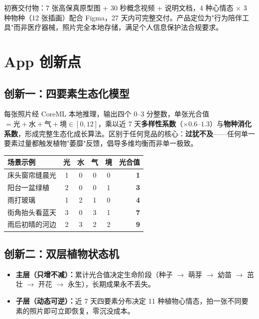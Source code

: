 \documentclass[11pt, a4paper]{article}
\newcommand{\kw}[1]{\textbf{#1}}
\begin{document}
初赛交付物：7 张高保真原型图 + 30 秒概念视频 + 说明文档，4 种心情态 $\times$ 3 种物种（12 张插画）配合 Figma，27 天内可完整交付。产品定位为"行为陪伴工具"而非医疗器械，照片完全本地存储，满足个人信息保护法合规要求。


\section{App 创新点}

\subsection*{创新一：四要素生态化模型}

每张照片经 CoreML 本地推理，输出四个 0--3 分整数，单张光合值 $= \text{光} + \text{水} + \text{气} + \text{境} \in [0,12]$，乘以近 7 天\kw{多样性系数}（$\times 0.6$--$1.3$）与\kw{物种消化系数}，形成完整生态化成长算法。区别于任何竞品的核心：\textbf{过犹不及}——任何单一要素过量都触发植物"萎靡"反馈，倡导多维均衡而非单一极致。

\begin{center}
\begin{tabular}{lccccr}
    \toprule
    \rowcolor{Row}
    场景示例 & 光 & 水 & 气 & 境 & 光合值 \\
    \midrule
    床头窗帘缝晨光 & 1 & 0 & 0 & 0 & \textbf{1} \\
    \rowcolor{Row}
    阳台一盆绿植   & 2 & 0 & 0 & 1 & \textbf{3} \\
    雨打玻璃       & 1 & 2 & 1 & 0 & \textbf{4} \\
    \rowcolor{Row}
    街角抬头看蓝天 & 3 & 0 & 3 & 1 & \textbf{7} \\
    雨后初晴的河边 & 2 & 3 & 2 & 2 & \textbf{9} \\
    \bottomrule
\end{tabular}
\end{center}

\subsection*{创新二：双层植物状态机}

\begin{itemize}
    \item \textbf{主层（只增不减）：}累计光合值决定生命阶段（种子 $\to$ 萌芽 $\to$ 幼苗 $\to$ 茁壮 $\to$ 开花 $\to$ 永生），长期成果永不丢失。
    \item \textbf{子层（动态可逆）：}近 7 天四要素分布决定 11 种植物心情态，拍一张不同要素的照片即可立即恢复，零沉没成本。
\end{itemize}
\end{document}
